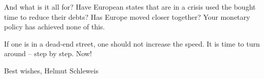 {{And what is it all for? Have European states that are in a crisis used the bought time to reduce their debts? Has Europe moved closer together? Your monetary policy has achieved none of this.

If one is in a dead-end street, one should not increase the speed. It is time to turn around – step by step. Now!

Best wishes,
Helmut Schleweis
}
}


